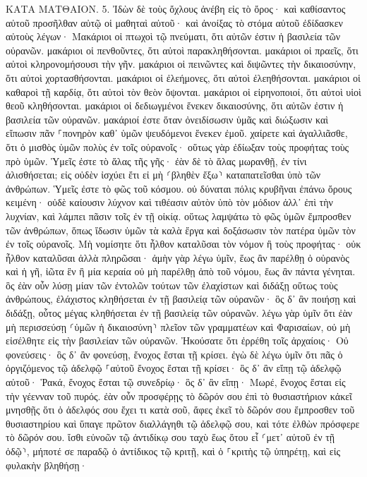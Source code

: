 \documentclass[twoside, 9pt]{extreport}
\begin{document}
ΚΑΤΑ ΜΑΤΘΑΙΟΝ.
5.
Ἰδὼν δὲ τοὺς ὄχλους ἀνέβη εἰς τὸ ὄρος· καὶ καθίσαντος αὐτοῦ προσῆλθαν αὐτῷ οἱ μαθηταὶ αὐτοῦ· 
καὶ ἀνοίξας τὸ στόμα αὐτοῦ ἐδίδασκεν αὐτοὺς λέγων· 
Μακάριοι οἱ πτωχοὶ τῷ πνεύματι, ὅτι αὐτῶν ἐστιν ἡ βασιλεία τῶν οὐρανῶν. 
μακάριοι οἱ πενθοῦντες, ὅτι αὐτοὶ παρακληθήσονται. 
μακάριοι οἱ πραεῖς, ὅτι αὐτοὶ κληρονομήσουσι τὴν γῆν. 
μακάριοι οἱ πεινῶντες καὶ διψῶντες τὴν δικαιοσύνην, ὅτι αὐτοὶ χορτασθήσονται. 
μακάριοι οἱ ἐλεήμονες, ὅτι αὐτοὶ ἐλεηθήσονται. 
μακάριοι οἱ καθαροὶ τῇ καρδίᾳ, ὅτι αὐτοὶ τὸν θεὸν ὄψονται. 
μακάριοι οἱ εἰρηνοποιοί, ὅτι αὐτοὶ υἱοὶ θεοῦ κληθήσονται. 
μακάριοι οἱ δεδιωγμένοι ἕνεκεν δικαιοσύνης, ὅτι αὐτῶν ἐστιν ἡ βασιλεία τῶν οὐρανῶν. 
μακάριοί ἐστε ὅταν ὀνειδίσωσιν ὑμᾶς καὶ διώξωσιν καὶ εἴπωσιν πᾶν ⸀πονηρὸν καθ᾽ ὑμῶν ψευδόμενοι ἕνεκεν ἐμοῦ. 
χαίρετε καὶ ἀγαλλιᾶσθε, ὅτι ὁ μισθὸς ὑμῶν πολὺς ἐν τοῖς οὐρανοῖς· οὕτως γὰρ ἐδίωξαν τοὺς προφήτας τοὺς πρὸ ὑμῶν. 
Ὑμεῖς ἐστε τὸ ἅλας τῆς γῆς· ἐὰν δὲ τὸ ἅλας μωρανθῇ, ἐν τίνι ἁλισθήσεται; εἰς οὐδὲν ἰσχύει ἔτι εἰ μὴ ⸂βληθὲν ἔξω⸃ καταπατεῖσθαι ὑπὸ τῶν ἀνθρώπων. 
Ὑμεῖς ἐστε τὸ φῶς τοῦ κόσμου. οὐ δύναται πόλις κρυβῆναι ἐπάνω ὄρους κειμένη· 
οὐδὲ καίουσιν λύχνον καὶ τιθέασιν αὐτὸν ὑπὸ τὸν μόδιον ἀλλ᾽ ἐπὶ τὴν λυχνίαν, καὶ λάμπει πᾶσιν τοῖς ἐν τῇ οἰκίᾳ. 
οὕτως λαμψάτω τὸ φῶς ὑμῶν ἔμπροσθεν τῶν ἀνθρώπων, ὅπως ἴδωσιν ὑμῶν τὰ καλὰ ἔργα καὶ δοξάσωσιν τὸν πατέρα ὑμῶν τὸν ἐν τοῖς οὐρανοῖς. 
Μὴ νομίσητε ὅτι ἦλθον καταλῦσαι τὸν νόμον ἢ τοὺς προφήτας· οὐκ ἦλθον καταλῦσαι ἀλλὰ πληρῶσαι· 
ἀμὴν γὰρ λέγω ὑμῖν, ἕως ἂν παρέλθῃ ὁ οὐρανὸς καὶ ἡ γῆ, ἰῶτα ἓν ἢ μία κεραία οὐ μὴ παρέλθῃ ἀπὸ τοῦ νόμου, ἕως ἂν πάντα γένηται. 
ὃς ἐὰν οὖν λύσῃ μίαν τῶν ἐντολῶν τούτων τῶν ἐλαχίστων καὶ διδάξῃ οὕτως τοὺς ἀνθρώπους, ἐλάχιστος κληθήσεται ἐν τῇ βασιλείᾳ τῶν οὐρανῶν· ὃς δ᾽ ἂν ποιήσῃ καὶ διδάξῃ, οὗτος μέγας κληθήσεται ἐν τῇ βασιλείᾳ τῶν οὐρανῶν. 
λέγω γὰρ ὑμῖν ὅτι ἐὰν μὴ περισσεύσῃ ⸂ὑμῶν ἡ δικαιοσύνη⸃ πλεῖον τῶν γραμματέων καὶ Φαρισαίων, οὐ μὴ εἰσέλθητε εἰς τὴν βασιλείαν τῶν οὐρανῶν. 
Ἠκούσατε ὅτι ἐρρέθη τοῖς ἀρχαίοις· Οὐ φονεύσεις· ὃς δ᾽ ἂν φονεύσῃ, ἔνοχος ἔσται τῇ κρίσει. 
ἐγὼ δὲ λέγω ὑμῖν ὅτι πᾶς ὁ ὀργιζόμενος τῷ ἀδελφῷ ⸀αὐτοῦ ἔνοχος ἔσται τῇ κρίσει· ὃς δ᾽ ἂν εἴπῃ τῷ ἀδελφῷ αὐτοῦ· Ῥακά, ἔνοχος ἔσται τῷ συνεδρίῳ· ὃς δ᾽ ἂν εἴπῃ· Μωρέ, ἔνοχος ἔσται εἰς τὴν γέενναν τοῦ πυρός. 
ἐὰν οὖν προσφέρῃς τὸ δῶρόν σου ἐπὶ τὸ θυσιαστήριον κἀκεῖ μνησθῇς ὅτι ὁ ἀδελφός σου ἔχει τι κατὰ σοῦ, 
ἄφες ἐκεῖ τὸ δῶρόν σου ἔμπροσθεν τοῦ θυσιαστηρίου καὶ ὕπαγε πρῶτον διαλλάγηθι τῷ ἀδελφῷ σου, καὶ τότε ἐλθὼν πρόσφερε τὸ δῶρόν σου. 
ἴσθι εὐνοῶν τῷ ἀντιδίκῳ σου ταχὺ ἕως ὅτου εἶ ⸂μετ᾽ αὐτοῦ ἐν τῇ ὁδῷ⸃, μήποτέ σε παραδῷ ὁ ἀντίδικος τῷ κριτῇ, καὶ ὁ ⸀κριτὴς τῷ ὑπηρέτῃ, καὶ εἰς φυλακὴν βληθήσῃ· 
\end{document}
